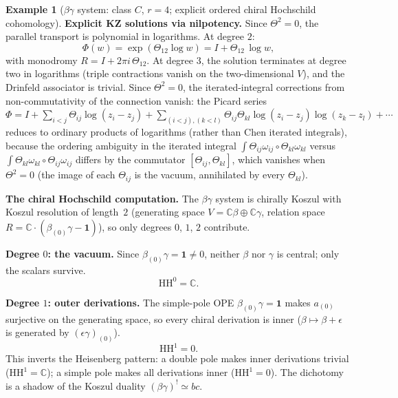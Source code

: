 \documentclass[11pt,reqno]{amsart}
\theoremstyle{definition}
\newtheorem{example}[theorem]{Example}
\theoremstyle{remark}
\newcommand{\HH}{\mathrm{HH}}
\newcommand{\CC}{\mathbb{C}}
\numberwithin{equation}{section}
\begin{document}
\begin{example}[$\beta\gamma$ system: class $C$, $r = 4$;
explicit ordered chiral Hochschild cohomology]
\medskip
\noindent
\textbf{Explicit KZ solutions via nilpotency.}
Since $\Theta^2 = 0$, the parallel transport is polynomial
in logarithms. At degree $2$:
\begin{equation}\label{eq:bg-kz-sol-2}
  \Phi(w) = \exp(\Theta_{12} \log w)
  = I + \Theta_{12}\,\log w,
\end{equation}
with monodromy $R = I + 2\pi i\,\Theta_{12}$.
At degree $3$, the solution terminates at degree two in
logarithms (triple contractions vanish on the
two-dimensional $V$), and the Drinfeld associator is
trivial. Since $\Theta^2 = 0$, the iterated-integral
corrections from non-commutativity of the connection
vanish: the Picard series
$\Phi = I + \sum_{i<j}\Theta_{ij}\log(z_i - z_j)
+ \sum_{(i<j),(k<l)}\Theta_{ij}\Theta_{kl}
\log(z_i - z_j)\log(z_k - z_l) + \cdots$
reduces to ordinary products of logarithms (rather than
Chen iterated integrals), because the ordering ambiguity
in the iterated integral $\int \Theta_{ij}\omega_{ij}
\circ \Theta_{kl}\omega_{kl}$ versus
$\int \Theta_{kl}\omega_{kl} \circ \Theta_{ij}\omega_{ij}$
differs by the commutator $[\Theta_{ij}, \Theta_{kl}]$,
which vanishes when $\Theta^2 = 0$ (the image of each
$\Theta_{ij}$ is the vacuum, annihilated by every
$\Theta_{kl}$).

\medskip
\noindent
\textbf{The chiral Hochschild computation.}
The $\beta\gamma$ system is chirally Koszul with
Koszul resolution of length~$2$ (generating space
$V = \CC\beta \oplus \CC\gamma$, relation space
$R = \CC \cdot (\beta_{(0)}\gamma - \mathbf{1})$), so only
degrees $0$, $1$, $2$ contribute.

\medskip
\noindent
\textbf{Degree $0$: the vacuum.}
Since $\beta_{(0)}\gamma = \mathbf{1} \neq 0$, neither
$\beta$ nor $\gamma$ is central; only the scalars survive.
\begin{equation}\label{eq:bg-hh0}
\HH^0 = \CC.
\end{equation}

\medskip
\noindent
\textbf{Degree $1$: outer derivations.}
The simple-pole OPE $\beta_{(0)}\gamma = \mathbf{1}$ makes
$a_{(0)}$ surjective on the generating space, so every
chiral derivation is inner ($\beta \mapsto \beta + \epsilon$
is generated by $(\epsilon\gamma)_{(0)}$).
\begin{equation}\label{eq:bg-hh1}
\HH^1 = 0.
\end{equation}
This inverts the Heisenberg pattern: a double pole makes
inner derivations trivial ($\HH^1 = \CC$); a simple pole
makes all derivations inner ($\HH^1 = 0$). The dichotomy
is a shadow of the Koszul duality
$(\beta\gamma)^! \simeq bc$.


\end{example}
\end{document}
